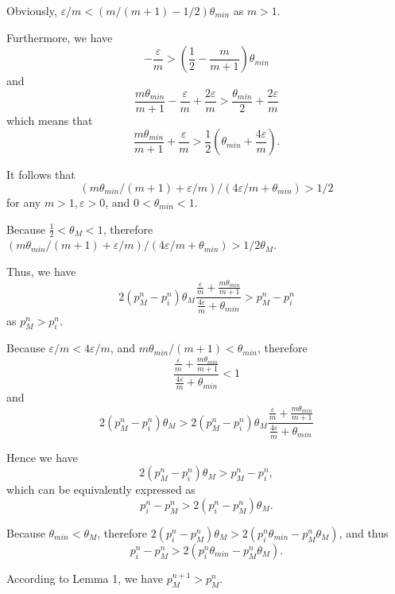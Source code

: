 \documentclass[10pt,journal,cspaper,compsoc,onecolumn]{IEEEtran}
\begin{document}
\begin{IEEEproof}
Obviously, $\varepsilon/m < (m/(m + 1) - 1/2)\theta_{min}$ as $m > 1$.

Furthermore, we have
$$-\displaystyle\frac{\varepsilon}{m} > (\displaystyle\frac{1}{2} - \displaystyle\frac{m}{m + 1})\theta_{min}$$
and
$$\displaystyle\frac{m\theta_{min}}{m + 1} - \displaystyle\frac{\varepsilon}{m} + \displaystyle\frac{2\varepsilon}{m} > \displaystyle\frac{\theta_{min}}{2} + \displaystyle\frac{2\varepsilon}{m}$$
which means that
$$\displaystyle\frac{m\theta_{min}}{m + 1} + \displaystyle\frac{\varepsilon}{m}  > \displaystyle\frac{1}{2}(\theta_{min} + \displaystyle\frac{4\varepsilon}{m}).$$

It follows that
$$(m\theta_{min}/(m + 1) + \varepsilon/m)/(4\varepsilon/m + \theta_{min}) > 1/2$$ for any $m > 1, \varepsilon > 0$, and $0 < \theta_{min} < 1$.

Because $\frac{1}{2} < \theta_M < 1$, therefore
$(m\theta_{min}/(m + 1) + \varepsilon/m)/(4\varepsilon/m + \theta_{min}) > 1/2\theta_M$.

Thus, we have
$$2(p_M^n -p_i^n)\theta_M\displaystyle\frac{\displaystyle\frac{\varepsilon}{m} +\displaystyle\frac{m\theta_{min}}{m + 1}}{\displaystyle\frac{4\varepsilon}{m} + \theta_{min}} > p_M^n -p_i^n$$
as $p_M^n > p_i^n$.

Because $\varepsilon/m < 4\varepsilon/m$, and $m\theta_{min}/(m + 1) < \theta_{min}$, therefore
$$ \displaystyle\frac{\displaystyle\frac{\varepsilon}{m} +\displaystyle\frac{m\theta_{min}}{m + 1}}{\displaystyle\frac{4\varepsilon}{m} + \theta_{min}} < 1$$
and
$$ 2(p_M^n -p_i^n)\theta_M > 2(p_M^n -p_i^n)\theta_M\displaystyle\frac{\displaystyle\frac{\varepsilon}{m} +\displaystyle\frac{m\theta_{min}}{m + 1}}{\displaystyle\frac{4\varepsilon}{m} + \theta_{min}}$$

Hence we have
$$2(p_M^n -p_i^n)\theta_M > p_M^n -p_i^n,$$
which can be equivalently expressed as
$$p_i^n -p_M^n > 2(p_i^n - p_M^n)\theta_M.$$

Because $\theta_{min} < \theta_M$, therefore
$2(p_i^n - p_M^n)\theta_M > 2(p_i^n\theta_{min} - p_M^n\theta_M)$, and thus
$$p_i^n -p_M^n > 2(p_i^n\theta_{min} - p_M^n\theta_M).$$

According to Lemma 1, we have $p_M^{n + 1} > p_M^{n}$.
\end{IEEEproof}
\end{document}
